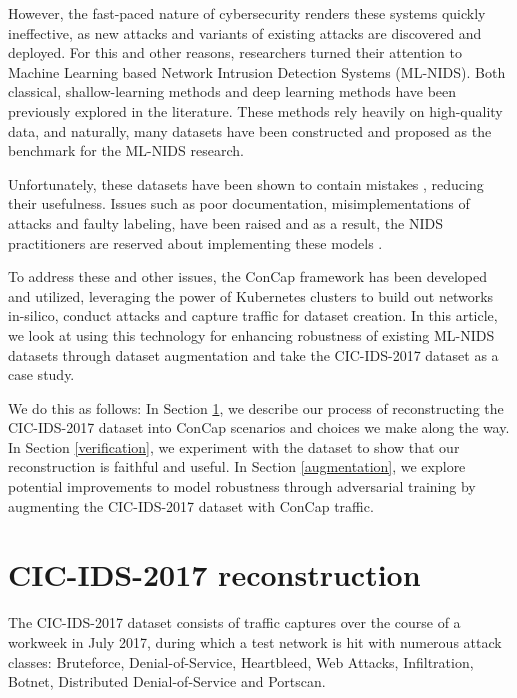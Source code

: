 \documentclass[conference]{IEEEtran}
\begin{document}
	However, the fast-paced nature of cybersecurity renders these systems quickly ineffective, as new attacks and variants of existing attacks are discovered and deployed. For this and other reasons, researchers turned their attention to Machine Learning based Network Intrusion Detection Systems (ML-NIDS). Both classical, shallow-learning methods \cite{knn_2002, j48_dt, nids_svm} and deep learning methods \cite{nids_cnn, analysis_autoencoders} have been previously explored in the literature. These methods rely heavily on high-quality data, and naturally, many datasets \cite{cic_2017, cic_2018, unsw-nb15, iscx_ids_2012} have been constructed and proposed as the benchmark for the ML-NIDS research. 
	
	Unfortunately, these datasets have been shown to contain mistakes \cite{troubleshooting_cic2017, bad_design_smells}, reducing their usefulness. Issues such as poor documentation, misimplementations of attacks and faulty labeling, have been raised and as a result, the NIDS practitioners are reserved about implementing these models \cite{sok_pragmatic_assessment}.
	
	To address these and other issues, the ConCap framework \cite{concap} has been developed and utilized, leveraging the power of Kubernetes clusters to build out networks in-silico, conduct attacks and capture traffic for dataset creation. In this article, we look at using this technology for enhancing robustness of existing ML-NIDS datasets through dataset augmentation and take the CIC-IDS-2017 dataset \cite{cic_2017} as a case study.
	
	We do this as follows: In Section \ref{dataset_reconstruction}, we describe our process of reconstructing the CIC-IDS-2017 dataset into ConCap scenarios and choices we make along the way. In Section \ref{verification}, we experiment with the dataset to show that our reconstruction is faithful and useful. In Section \ref{augmentation}, we explore potential improvements to model robustness through adversarial training by augmenting the CIC-IDS-2017 dataset with ConCap traffic.
	
	\section{CIC-IDS-2017 reconstruction}\label{dataset_reconstruction}
	The CIC-IDS-2017 dataset consists of traffic captures over the course of a workweek in July 2017, during which a test network is hit with numerous attack classes: Bruteforce, Denial-of-Service, Heartbleed, Web Attacks, Infiltration, Botnet, Distributed Denial-of-Service and Portscan. 
	
\end{document}
